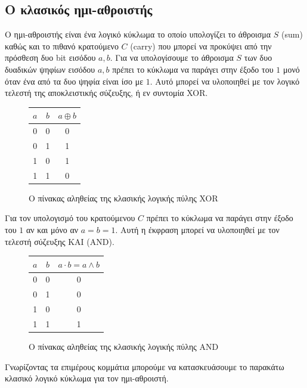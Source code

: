 \subsection{Ο κλασικός ημι-αθροιστής}
Ο ημι-αθροιστής είναι ένα λογικό κύκλωμα το οποίο υπολογίζει
το άθροισμα $S$ (sum) καθώς και το πιθανό κρατούμενο $C$ (carry)
που μπορεί να προκύψει από την πρόσθεση δυο bit εισόδου $a, b$.
Για να υπολογίσουμε το άθροισμα $S$ των δυο δυαδικών ψηφίων εισόδου $a, b$ πρέπει
το κύκλωμα να παράγει στην έξοδο του $1$ μονό όταν ένα από τα δυο ψηφία είναι
ίσο με $1$. Αυτό μπορεί να υλοποιηθεί με τον λογικό τελεστή της αποκλειστικής σύζευξης,
ή εν συντομία XOR.

\begin{figure}[ht]
    \centering
    \begin{tabular}{c c|c}
        $a$ & $b$ & $a \oplus b$ \\
        \hline
        0 & 0 & 0 \\
        0 & 1 & 1 \\
        1 & 0 & 1 \\
        1 & 1 & 0 \\
    \end{tabular}
    \caption{Ο πίνακας αληθείας της κλασικής λογικής πύλης XOR}
    \label{fig:1}
\end{figure}

Για τον υπολογισμό του κρατούμενου $C$ πρέπει το κύκλωμα να παράγει στην
έξοδο του $1$ αν και μόνο αν $a = b = 1$. Αυτή η έκφραση μπορεί να
υλοποιηθεί με τον τελεστή σύζευξης ΚΑΙ (AND).

\begin{figure}[ht]
    \centering
    \begin{tabular}{c c|c}
        $a$ & $b$ & $a \cdot b = a \land b$ \\
        \hline
        0 & 0 & 0 \\
        0 & 1 & 0 \\
        1 & 0 & 0 \\
        1 & 1 & 1 \\
    \end{tabular}
    \caption{Ο πίνακας αληθείας της κλασικής λογικής πύλης AND}
    \label{fig:2}
\end{figure}

Γνωρίζοντας τα επιμέρους κομμάτια μπορούμε να κατασκευάσουμε το παρακάτω
κλασικό λογικό κύκλωμα για τον ημι-αθροιστή.

